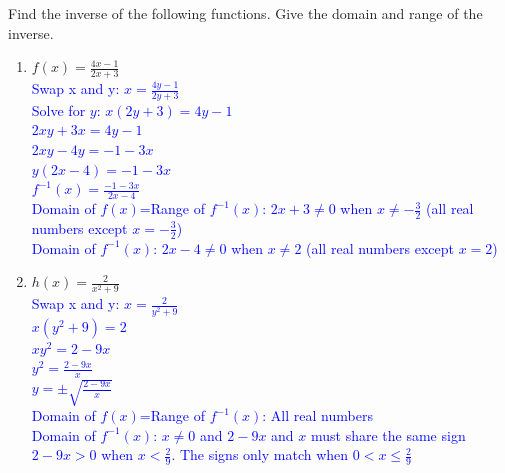 \documentclass{ximera}
\begin{document}
\begin{exercise}
    Find the inverse of the following functions.  Give the domain and range of the inverse. 
    \begin{enumerate}
    \item $f(x)=\frac{4x-1}{2x+3}$\\
    \textcolor{blue}{ Swap x and y: $x=\frac{4y-1}{2y+3}$\\
    Solve for $y$: $x(2y+3)=4y-1$\\
     $2xy+3x=4y-1$\\ 
     $2xy-4y=-1-3x$\\
     $y(2x-4)=-1-3x$\\
    $f^{-1}(x)=\frac{-1-3x}{2x-4}$\\
    Domain of $f(x)$=Range of $f^{-1}(x)$: $2x+3\neq 0$ when $x\neq -\frac32$ (all real numbers except $x=-\frac32$)\\
    Domain of $f^{-1}(x)$: $2x-4\neq0$ when $x\neq 2$ (all real numbers except $x=2$)}

    
    \item $h(x)=\frac{2}{x^2+9}$\\
    \textcolor{blue}{ Swap x and y: $x=\frac{2}{y^2+9}$\\
    $x(y^2+9)=2$\\
    $xy^2=2-9x$\\
    $y^2=\frac{2-9x}{x}$\\
    $y=\pm\sqrt{ \frac{2-9x}{x}}$\\
        Domain of $f(x)$=Range of $f^{-1}(x)$: All real numbers\\
    Domain of $f^{-1}(x)$: $x\neq 0$ and $2-9x$ and $x$ must share the same sign\\
    $2-9x>0$ when $x<\frac29$.  The signs only match when $0<x\leq \frac29$}
    

\end{enumerate}
\end{exercise}
\end{document}
